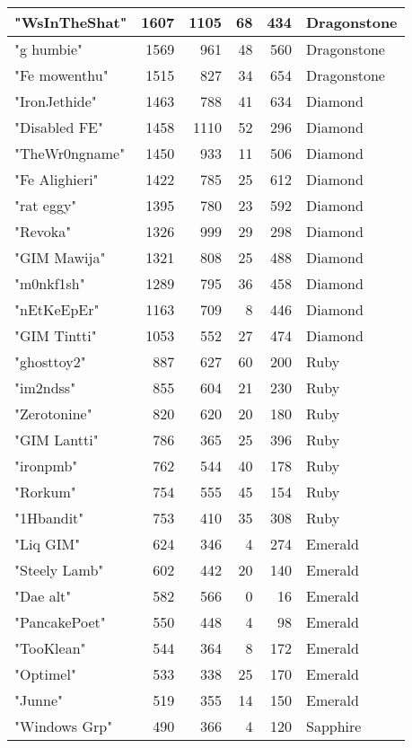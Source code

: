\documentclass{article}
\begin{document}
\begin{table}[htbp]
\begin{tabular}{|l|r|r|r|r|l|}
"WsInTheShat" & 1607 & 1105 & 68 & 434 & Dragonstone \\ \hline
"g humbie" & 1569 & 961 & 48 & 560 & Dragonstone \\ \hline
"Fe mowenthu" & 1515 & 827 & 34 & 654 & Dragonstone \\ \hline
"IronJethide" & 1463 & 788 & 41 & 634 & Diamond \\ \hline
"Disabled FE" & 1458 & 1110 & 52 & 296 & Diamond \\ \hline
"TheWr0ngname" & 1450 & 933 & 11 & 506 & Diamond \\ \hline
"Fe Alighieri" & 1422 & 785 & 25 & 612 & Diamond \\ \hline
"rat eggy" & 1395 & 780 & 23 & 592 & Diamond \\ \hline
"Revoka" & 1326 & 999 & 29 & 298 & Diamond \\ \hline
"GIM Mawija" & 1321 & 808 & 25 & 488 & Diamond \\ \hline
"m0nkf1sh" & 1289 & 795 & 36 & 458 & Diamond \\ \hline
"nEtKeEpEr" & 1163 & 709 & 8 & 446 & Diamond \\ \hline
"GIM Tintti" & 1053 & 552 & 27 & 474 & Diamond \\ \hline
"ghosttoy2" & 887 & 627 & 60 & 200 & Ruby \\ \hline
"im2ndss" & 855 & 604 & 21 & 230 & Ruby \\ \hline
"Zerotonine" & 820 & 620 & 20 & 180 & Ruby \\ \hline
"GIM Lantti" & 786 & 365 & 25 & 396 & Ruby \\ \hline
"ironpmb" & 762 & 544 & 40 & 178 & Ruby \\ \hline
"Rorkum" & 754 & 555 & 45 & 154 & Ruby \\ \hline
"1Hbandit" & 753 & 410 & 35 & 308 & Ruby \\ \hline
"Liq GIM" & 624 & 346 & 4 & 274 & Emerald \\ \hline
"Steely Lamb" & 602 & 442 & 20 & 140 & Emerald \\ \hline
"Dae alt" & 582 & 566 & 0 & 16 & Emerald \\ \hline
"PancakePoet" & 550 & 448 & 4 & 98 & Emerald \\ \hline
"TooKlean" & 544 & 364 & 8 & 172 & Emerald \\ \hline
"Optimel" & 533 & 338 & 25 & 170 & Emerald \\ \hline
"Junne" & 519 & 355 & 14 & 150 & Emerald \\ \hline
"Windows Grp" & 490 & 366 & 4 & 120 & Sapphire \\ \hline

\end{tabular}
\end{table}
\end{document}
